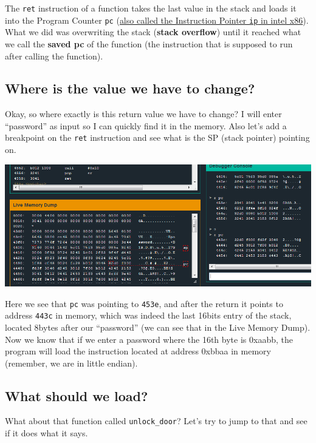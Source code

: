 \documentclass[a4paper,11pt]{article}
\begin{document}
The \texttt{ret} instruction of a function takes the last value in the
stack and loads it into the Program Counter \texttt{pc}
(\href{http://en.wikipedia.org/wiki/Program_counter}{also called the
Instruction Pointer \texttt{ip} in intel x86}).\\What we did was
overwriting the stack (\textbf{stack overflow}) until it reached what we
call the \textbf{saved pc} of the function (the instruction that is
supposed to run after calling the function).

\subsection{Where is the value we have to
change?}\label{where-is-the-value-we-have-to-change}

Okay, so where exactly is this return value we have to change? I will
enter ``password'' as input so I can quickly find it in the memory. Also
let's add a breakpoint on the \texttt{ret} instruction and see what is
the SP (stack pointer) pointing on.

\includegraphics{img/5_2.PNG}

Here we see that \texttt{pc} was pointing to \texttt{453e}, and after
the return it points to address \texttt{443c} in memory, which was
indeed the last 16bits entry of the stack, located 8bytes after our
``password'' (we can see that in the Live Memory Dump). Now we know that
if we enter a password where the 16th byte is 0xaabb, the program will
load the instruction located at address 0xbbaa in memory (remember, we
are in little endian).

\subsection{What should we load?}\label{what-should-we-load}

What about that function called \texttt{unlock\_door}? Let's try to jump
to that and see if it does what it says.
\end{document}
